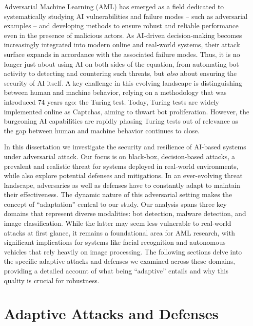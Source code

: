 Adversarial Machine Learning (AML) has emerged as a field dedicated to systematically studying \gls{AI} vulnerabilities and failure modes -- such as adversarial examples -- and developing methods to ensure robust and reliable performance even in the presence of malicious actors.
As AI-driven decision-making becomes increasingly integrated into modern online and real-world systems, their attack surface expands in accordance with the associated failure modes.
Thus, it is no longer just about using AI on both sides of the equation, from automating bot activity to detecting and countering such threats, but \textit{also} about ensuring the security of AI itself.
A key challenge in this evolving landscape is distinguishing between human and machine behavior, relying on a methodology that was introduced 74 years ago: the Turing test.
Today, Turing tests are widely implemented online as Captchas, aiming to thwart bot proliferation.
However, the burgeoning \gls{AI} capabilities are rapidly phasing Turing tests out of relevance as the gap between human and machine behavior continues to close.

In this dissertation we investigate the security and resilience of AI-based systems under adversarial attack.
Our focus is on black-box, decision-based attacks, a prevalent and realistic threat for systems deployed in real-world environments, while also explore potential defenses and mitigations.
In an ever-evolving threat landscape, adversaries as well as defenses have to constantly adapt to maintain their effectiveness.
The dynamic nature of this adversarial setting makes the concept of ``adaptation'' central to our study.
Our analysis spans three key domains that represent diverse modalities: bot detection, malware detection, and image classification.
While the latter may seem less vulnerable to real-world attacks at first glance, it remains a foundational area for \gls{AML} research, with significant implications for systems like facial recognition and autonomous vehicles that rely heavily on image processing.
The following sections delve into the specific adaptive attacks and defenses we examined across these domains, providing a detailed account of what being ``adaptive'' entails and why this quality is crucial for robustness.

\section{Adaptive Attacks and Defenses}


